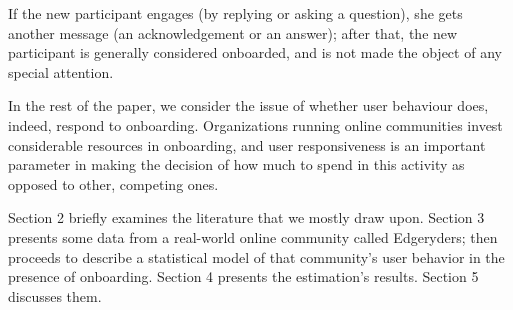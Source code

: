 If the new participant engages (by replying or asking a question), she gets another message (an acknowledgement or an answer); after that, the new participant is generally considered onboarded, and is not made the object of any special attention.

In the rest of the paper, we consider the issue of whether user behaviour does, indeed, respond to onboarding. Organizations running online communities invest considerable resources in onboarding, and user responsiveness is an important parameter in making the decision of how much to spend in this activity as opposed to other, competing ones.  

Section 2 briefly examines the literature that we mostly draw upon. Section 3 presents some data from a real-world online community called Edgeryders; then proceeds to describe a statistical model of that community's user behavior in the presence of onboarding. Section 4 presents the estimation's results. Section 5 discusses them.